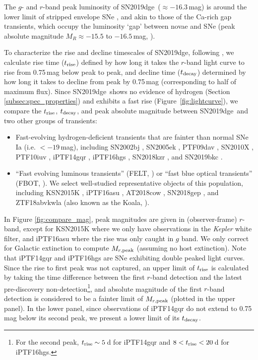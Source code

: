 \documentclass[twocolumn]{aastex63}
\newcommand{\name}{SN2019dge}
\begin{document}
\begin{CJK*}{UTF8}{gbsn}
The $g$- and $r$-band peak luminosity of \name\ ($\approx -16.3$\,mag) is around the lower limit 
of stripped envelope SNe \citep{Drout2011, Taddia2018, Prentice2019}, and akin to those of the Ca-rich 
gap transients, which occupy the luminosity `gap' between novae and SNe (peak absolute magnitude 
$M_R \approx -15.5$ to $-16.5$\,mag, \citealt{Kasliwal2012}).

To characterize the rise and decline timescales of \name, following \citet{Ho2020}, we calculate rise 
time ($t_{\rm rise}$) defined by how long it takes the $r$-band light curve to rise from 0.75\,mag below 
peak to peak, and decline time ($t_{\rm decay}$) determined by how long it takes to decline from peak 
by 0.75\,mag (corresponding to half of maximum flux). Since \name\ shows no evidence of hydrogen 
(Section \ref{subsec:spec_properties}) and exhibits a fast rise (Figure~\ref{fig:lightcurve}), we compare 
the $t_{\rm rise}$, $t_{\rm decay}$, and peak absolute magnitude between 
\name\ and two other groups of transients: 
\begin{itemize}
	\item Fast-evolving hydrogen-deficient transients that are fainter than normal SNe Ia (i.e. 
	$<-19$\,mag), including
	SN2002bj \citep{Poznanski2010},
	SN2005ek \citep{Drout2013},  
	PTF09dav \citep{Sullivan2011},
	SN2010X \citep{Kasliwal2010},
	PTF10iuv \citep{Kasliwal2012},
	iPTF14gqr \citep{De2018},
	iPTF16hgs \citep{DeKC2018},
	SN2018kzr \citep{McBrien2019}, 
	and SN2019bkc \citep{Chen2020}.
	\item ``Fast evolving luminous transients'' (FELT, \citealt{Rest2018}) or ``fast blue optical 
	transients'' (FBOT, \citealt{Margutti2019}).
	We select well-studied representative objects of this population, including
	KSN2015K \citep{Rest2018},
	iPTF16asu \citep{Whitesides2017}, 
	AT2018cow \citep{Prentice2018, Perley2019},
	SN2018gep \citep{Ho2019},
	and ZTF18abvkwla (also known as the Koala, \citealt{Ho2020}).
\end{itemize}

In Figure \ref{fig:compare_mag}, peak magnitudes are given in (observer-frame) $r$-band, except for 
KSN2015K where we only have observations in the \textit{Kepler} white filter, and iPTF16asu where the 
rise was only caught in $g$ band. We only correct for Galactic extinction to compute $M_{r\rm , 
peak}$ (assuming no host extinction). Note that iPTF14gqr and iPTF16hgs are SNe exhibiting 
double peaked light curves. Since the rise to first peak was not captured, an upper limit of $t_{\rm 
rise}$ is calculated by taking the time difference between the first $r$-band detection and the latest 
pre-discovery non-detection\footnote{For the second peak, $t_{\rm rise}\sim5$\,d for iPTF14gqr and 
$8<t_{\rm rise}<20$\,d for iPTF16hgs.}, and absolute magnitude of the first $r$-band detection is 
considered to be a fainter limit of $M_{r\rm , peak}$ (plotted in the upper panel). In the lower panel, 
since observations of iPTF14gqr do not extend to 0.75\,mag below its second peak, we present a 
lower limit of its $t_{\rm decay}$.


\end{CJK*}
\end{document}
